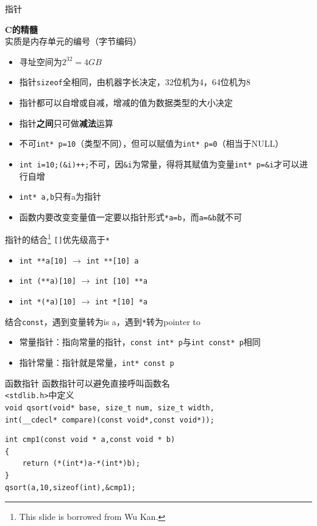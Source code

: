 \documentclass{myslide}
\begin{document}
\begin{frame}[fragile]{指针}
\begin{center}
\Large \textbf{C的精髓}\\
实质是内存单元的编号（字节编码）
\end{center}
\pause
\begin{itemize}[<+->]
	\item 寻址空间为$2^{32}=4GB$
	\item 指针\verb'sizeof'全相同，由机器字长决定，32位机为4，64位机为8
	\item 指针都可以自增或自减，增减的值为数据类型的大小决定
	\item 指针\textbf{之间}只可做\textbf{减法}运算
	\item 不可\verb'int* p=10'（类型不同），但可以赋值为\verb'int* p=0'（相当于NULL）
	\item \verb'int i=10;(&i)++;'不可，因\verb'&i'为常量，得将其赋值为变量\verb'int* p=&i'才可以进行自增
	\item \verb'int* a,b'只有a为指针
	\item 函数内要改变变量值一定要以指针形式\verb'*a=b'，而\verb'a=&b'就不可
\end{itemize}
\end{frame}


\begin{frame}[fragile]{指针的结合\protect\footnote{This slide is borrowed from Wu Kan.}}
\verb'[]'优先级高于\verb'*'
\begin{itemize}
	\item \verb'int **a[10]' $\to$ \verb'int **[10] a'
	\item \verb'int (**a)[10]' $\to$ \verb'int [10] **a'
	\item \verb'int *(*a)[10]' $\to$ \verb'int *[10] *a'
\end{itemize}
\pause
结合\verb'const'，遇到变量转为is a，遇到\verb'*'转为pointer to
\begin{itemize}
	\item 常量指针：指向常量的指针，\verb'const int* p'与\verb'int const* p'相同
	\item 指针常量：指针就是常量，\verb'int* const p'
\end{itemize}
\end{frame}

\begin{frame}[fragile]{函数指针}
函数指针可以避免直接呼叫函数名\\
\verb'<stdlib.h>'中定义\\
\verb'void qsort(void* base, size_t num, size_t width,'\\
\verb'int(__cdecl* compare)(const void*,const void*));'
\begin{lstlisting}
int cmp1(const void * a,const void * b)  
{  
    return (*(int*)a-*(int*)b); 
} 
qsort(a,10,sizeof(int),&cmp1);
\end{lstlisting}
\end{frame}
\end{document}
